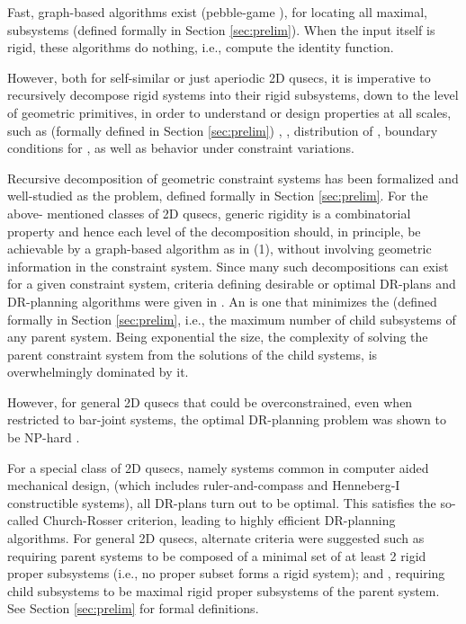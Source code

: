 \medskip\noindent
{}
Fast, graph-based algorithms exist (pebble-game \cite{Jacobs:1997:PG,lee2005finding}), for locating all maximal,
 subsystems (defined formally in Section
\ref{sec:prelim}). When the input itself is rigid, these
algorithms do nothing, i.e., compute the identity function.

However, both for self-similar or just aperiodic 2D qusecs, it is
imperative to recursively decompose rigid systems into their rigid
subsystems, down to the level of geometric primitives, in order to
understand or design properties at all scales, such as (formally
defined in Section \ref{sec:prelim}) , ,
distribution of , boundary conditions for
, as well as behavior under constraint variations.

\medskip\noindent
{}
Recursive decomposition of geometric constraint systems has been
formalized \cite{hoffman2001decompositionI,hoffman2001decompositionII} and well-studied \cite{jermann2006decomposition,sitharam2005combinatorial} as the
 problem, defined formally in
Section \ref{sec:prelim}. For the above-
mentioned classes of 2D qusecs, generic rigidity is a combinatorial
property and hence each level of the decomposition should, in
principle, be achievable by a graph-based algorithm as in (1), without
involving geometric information in the constraint system. Since many
such decompositions can exist for a given constraint system, criteria
defining desirable or optimal DR-plans and DR-planning algorithms were
given in \cite{hoffman2001decompositionI}. An  is one that minimizes
the  (defined formally in Section \ref{sec:prelim}, i.e.,
the maximum number of child subsystems of any parent system.
Being exponential the size, the complexity of solving the parent
constraint system from the solutions of the child systems, is overwhelmingly
dominated by it.

However, for general 2D qusecs that could be overconstrained, even
when restricted to bar-joint systems, the optimal DR-planning problem
was shown to be NP-hard \cite{lomonosov2004graph}.

\medskip\noindent
{}
For a special class of 2D qusecs, namely 
systems  \cite{fudos1997graph,owen1991algebraic,joan-arinyo2004revisiting}  common in computer aided mechanical design, (which
includes ruler-and-compass and Henneberg-I constructible systems), all
DR-plans turn out to be optimal. This satisfies the so-called \dfn
{Church-Rosser} criterion, leading to highly efficient DR-planning
algorithms. For general 2D qusecs, alternate criteria were suggested
such as  requiring parent systems to be
composed of a minimal set of at least 2 rigid proper subsystems (i.e.,
no proper subset forms a rigid system); and ,
requiring child subsystems to be maximal rigid proper subsystems of
the parent system. See Section \ref{sec:prelim} for formal definitions.

